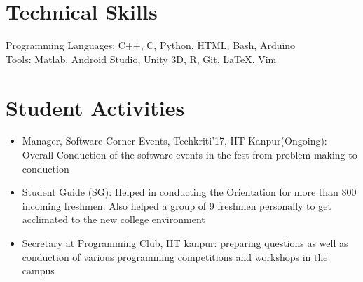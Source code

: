 \documentclass{article}
\begin{document}
\section{Technical Skills}
Programming Languages: C++, C, Python, HTML, Bash, Arduino \\
Tools: Matlab, Android Studio, Unity 3D, R, Git, \LaTeX, Vim

\section{Student Activities}
\begin{itemize}
        \renewcommand\labelitemi{--}
\item Manager, Software Corner Events, Techkriti'17, IIT Kanpur(Ongoing): Overall Conduction of the software events in the fest from problem making to conduction  
    \item Student Guide (SG): Helped in conducting the Orientation for more than 800 incoming freshmen. Also helped a group of 9 freshmen personally to get acclimated to the new college environment 
    \item Secretary at Programming Club, IIT kanpur: preparing questions as well as conduction of various programming competitions and workshops in the campus

        
    
\end{itemize}
\end{document}
